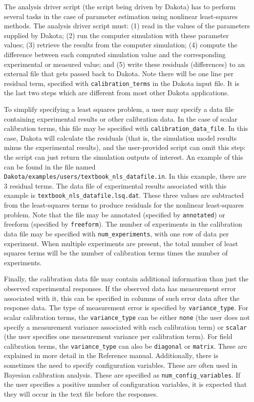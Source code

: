 The analysis driver script (the script being driven by Dakota) has to
perform several tasks in the case of parameter estimation using
nonlinear least-squares methods. The analysis driver script must: (1)
read in the values of the parameters supplied by Dakota; (2) run the
computer simulation with these parameter values; (3) retrieve the
results from the computer simulation; (4) compute the difference
between each computed simulation value and the corresponding
experimental or measured value; and (5) write these residuals
(differences) to an external file that gets passed back to
Dakota. Note there will be one line per residual term, specified with
\texttt{calibration\_terms} in the Dakota input file. It is the last
two steps which are different from most other Dakota applications.

To simplify specifying a least squares problem, a user may specify a
data file containing experimental results or other calibration data.
In the case of scalar calibration terms, 
this file may be specified with \texttt{calibration\_data\_file}.  In
this case, Dakota will calculate the residuals (that is, the
simulation model results minus the experimental results), and the
user-provided script can omit this step: the script can just return
the simulation outputs of interest. An example of this can be found in
the file named
\texttt{Dakota/examples/users/textbook\_nls\_datafile.in}.  In this
example, there are 3 residual terms. The data file of experimental
results associated with this example is
\texttt{textbook\_nls\_datafile.lsq.dat}.  These three values are
subtracted from the least-squares terms to produce residuals for the
nonlinear least-squares problem.  Note that the file may be annotated
(specified by \texttt{annotated}) or freeform (specified by
\texttt{freeform}). The number of experiments in the calibration data
file may be specified with \texttt{num\_experiments}, with one row of
data per experiment. 
When multiple experiments are present, the total number of least 
squares terms will be the number of calibration terms times the number of 
experiments.

Finally, the calibration data file may contain additional 
information than just
the observed experimental responses. If the observed data has
measurement error associated with it, this can be specified in columns
of such error data after the response data.  The type of measurement 
error is specified by \texttt{variance\_type}.  For scalar 
calibration terms, the \texttt{variance\_type} can be either \texttt{none} 
(the user does not specify a measurement variance associated with each 
calibration term) or \texttt{scalar} (the user specifies one measurement variance 
per calibration term). 
For field calibration terms, the \texttt{variance\_type} can also 
be \texttt{diagonal} or \texttt{matrix}.  These are explained in 
more detail in the Reference manual.
Additionally, there is sometimes the
need to specify configuration variables.  These are often used in
Bayesian calibration analysis. These are specified as
\texttt{num\_config\_variables}. If the user specifies a positive
number of configuration variables, it is expected that they will occur
in the text file before the responses.

